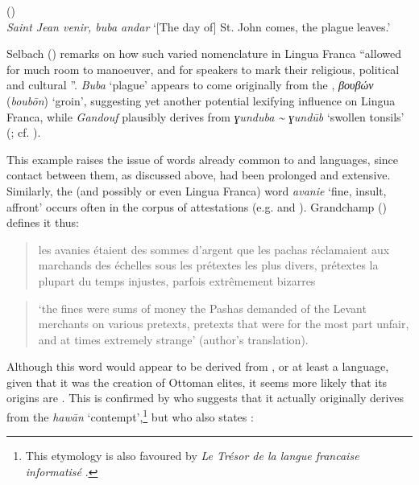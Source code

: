 \documentclass[output=paper]{langsci/langscibook}
\begin{document}
	\ea
	(\citealt{Rehbinder1800})\\
	\textit{Saint Jean venir, buba andar} 
	\glt ‘[The day of] St. John comes, the plague leaves.’ 
	\z
	
	Selbach (\citeyear[44]{Selbach2008}) remarks on how such varied nomenclature in Lingua Franca ``allowed for much room to manoeuver, and for speakers to mark their religious, political and cultural ''. \textit{Buba} ‘plague’ appears to come originally from the , \textit{βουβών} (\textit{boubōn}) ‘groin’, suggesting yet another potential lexifying influence on Lingua Franca, while \textit{Gandouf} plausibly derives from  \textit{ɣunduba {\textasciitilde} ɣundūb} ‘swollen tonsils’ (\citealt[72]{Schuchardt1909}; cf. \citealt[45]{Selbach2008}). 
	
	This example raises the issue of words already common to  and  languages, since contact between them, as discussed above, had been prolonged and extensive. Similarly, the  (and possibly  or even Lingua Franca) word \textit{avanie} ‘fine, insult, affront’ occurs often in the corpus of attestations (e.g. \citealt{Pananti1841} and \citealt{Grandchamp1920}). Grandchamp (\citeyear[xiii]{Grandchamp1920}) defines it thus: 
	
	\begin{quote}
		les avanies étaient des sommes d'argent que les pachas réclamaient aux marchands des échelles sous les prétextes les plus divers, prétextes la plupart du temps injustes, parfois extrêmement bizarres
	\end{quote}
	
	\begin{quote}
		‘the fines were sums of money the Pashas demanded of the Levant merchants on various pretexts, pretexts that were for the most part unfair, and at times extremely strange’ (author's translation).
	\end{quote}
	
	Although this word would appear to be derived from , or at least a  language, given that it was the creation of Ottoman elites, it seems more likely that its origins are . This is confirmed by \citet{Pihan1847} who suggests that it actually originally derives from the  \textit{hawān} ‘contempt’,\footnote{This etymology is also favoured by \textit{Le Trésor de la langue francaise informatisé} \citep{Dendien1994}.} but who also states \citep[46]{Pihan1847}:
	
\end{document}
